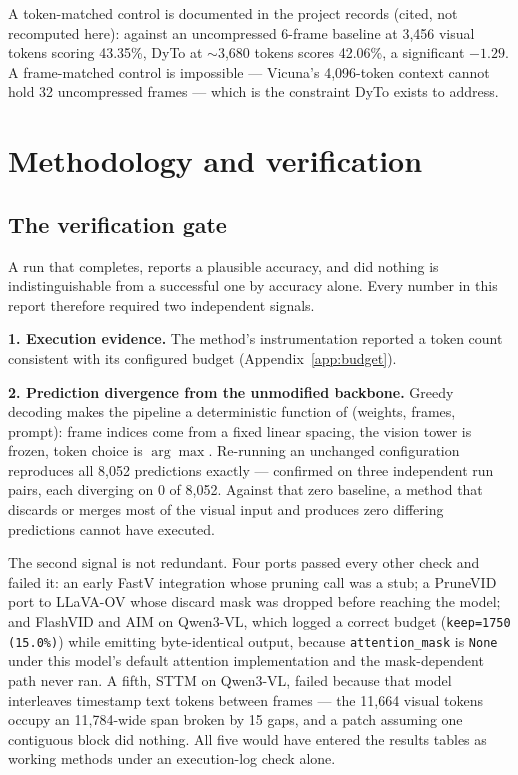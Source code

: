\documentclass[11pt]{article}
\begin{document}
A token-matched control is documented in the project records (cited, not
recomputed here): against an uncompressed 6-frame baseline at 3{,}456 visual
tokens scoring 43.35\%, DyTo at $\sim$3{,}680 tokens scores 42.06\%, a
significant $-1.29$. A frame-matched control is impossible --- Vicuna's
4{,}096-token context cannot hold 32 uncompressed frames --- which is the
constraint DyTo exists to address.

\appendix
\newpage

\section{Methodology and verification}
\label{app:method}

\subsection*{The verification gate}
\label{app:gate}

A run that completes, reports a plausible accuracy, and did nothing is
indistinguishable from a successful one by accuracy alone. Every number in
this report therefore required two independent signals.

\textbf{1. Execution evidence.} The method's instrumentation reported a
token count consistent with its configured budget (Appendix~\ref{app:budget}).

\textbf{2. Prediction divergence from the unmodified backbone.} Greedy
decoding makes the pipeline a deterministic function of (weights, frames,
prompt): frame indices come from a fixed linear spacing, the vision tower is
frozen, token choice is $\arg\max$. Re-running an unchanged configuration
reproduces all 8{,}052 predictions exactly --- confirmed on three
independent run pairs, each diverging on 0 of 8{,}052. Against that zero
baseline, a method that discards or merges most of the visual input and
produces zero differing predictions cannot have executed.

The second signal is not redundant. Four ports passed every other check and
failed it: an early FastV integration whose pruning call was a stub; a
PruneVID port to LLaVA-OV whose discard mask was dropped before reaching the
model; and FlashVID and AIM on Qwen3-VL, which logged a correct budget
(\texttt{keep=1750 (15.0\%)}) while emitting byte-identical output, because
\texttt{attention\_mask} is \texttt{None} under this model's default
attention implementation and the mask-dependent path never ran. A fifth,
STTM on Qwen3-VL, failed because that model interleaves timestamp text
tokens between frames --- the 11{,}664 visual tokens occupy an 11{,}784-wide
span broken by 15 gaps, and a patch assuming one contiguous block did
nothing. All five would have entered the results tables as working methods
under an execution-log check alone.
\end{document}
